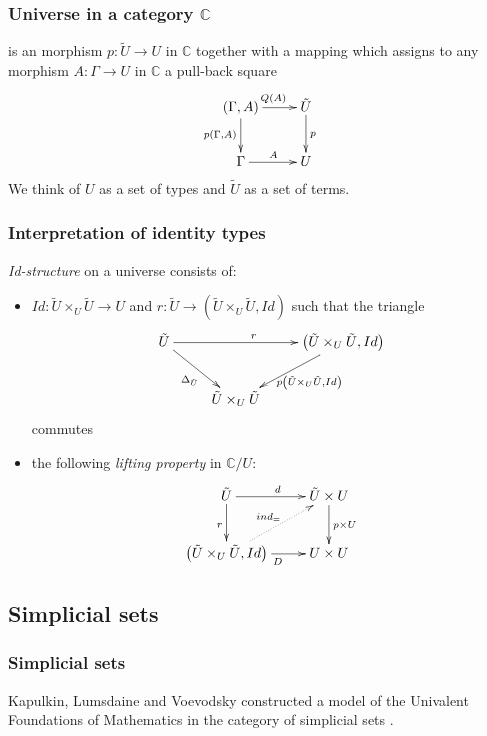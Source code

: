 \documentclass[dvipdfmx]{beamer}
\begin{document}
\begin{frame}
  \frametitle{Universe in a category ${\mathbb C}$}
  is an morphism $p : \tilde{U} \to U$ in ${\mathbb C}$
  together with a mapping which assigns to any morphism
  $A : \Gamma \to U$ in ${\mathbb C}$ a pull-back square
  \[
    \xymatrix{
      \left( \Gamma , A \right) \ar[r]^{Q \left( A \right)}
      \ar[d]_{p \left( \Gamma , A \right)}
        & \tilde{U} \ar[d]^{p}
        \\
        \Gamma \ar[r]^{A}
        & U
    }
  \]
  We think of $U$ as a set of types and
  $\tilde{U}$ as a set of terms.
\end{frame}

\begin{frame}
  \frametitle{Interpretation of identity types}
  {\it Id-structure} on a universe consists of:
  \begin{itemize}
    \item $Id : \tilde{U} \times _{U} \tilde{U} \to U$
    and $r : \tilde{U} \to
    \left( \tilde{U} \times _{U} \tilde{U} , Id\right)$
    such that the triangle
    \[
      \xymatrix{
        \tilde{U} \ar[rr]^{r}
        \ar[dr]_{\Delta _{\tilde{U}}}
        &
        & \left( \tilde{U} \times _{U} \tilde{U} , Id \right)
        \ar[dl]^{p \left( \tilde{U} \times _{U} \tilde{U} , Id \right)}
        \\
        & \tilde{U} \times _{U} \tilde{U}
        &
      }
    \]
    commutes
    \item the following {\it lifting property}
      in ${\mathbb C} / U$:
      \[
        \xymatrix{
          \tilde{U} \ar[r]^{d} \ar[d]_{r}
          & \tilde{U} \times U \ar[d]^{p \times U}
          \\
          \left( \tilde{U} \times _{U} \tilde{U} , Id \right)
          \ar@{.>}[ur]^{ind_{=}} \ar[r]_{D}
          & U \times U
        }
      \]
  \end{itemize}
\end{frame}

\subsection{Simplicial sets}

\begin{frame}
  \frametitle{Simplicial sets}
  Kapulkin, Lumsdaine and Voevodsky constructed
  a model of the Univalent Foundations of Mathematics
  in the category of simplicial sets
  \cite{kapulkin2012simplicial,kapulkin2012univalence}.
\end{frame}
\end{document}
